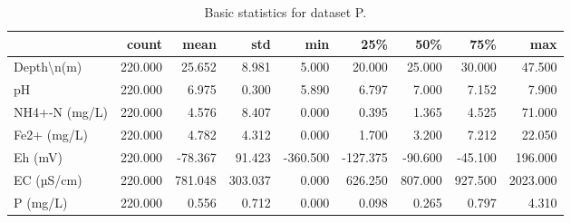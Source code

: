 \begin{table}
\centering
\caption{Basic statistics for dataset P.}
\begin{tabular}{lrrrrrrrr}
\toprule
{} &   count &    mean &     std &      min &      25\% &     50\% &     75\% &      max \\
\midrule
Depth\textbackslash n(m)    & 220.000 &  25.652 &   8.981 &    5.000 &   20.000 &  25.000 &  30.000 &   47.500 \\
pH            & 220.000 &   6.975 &   0.300 &    5.890 &    6.797 &   7.000 &   7.152 &    7.900 \\
NH4+-N (mg/L) & 220.000 &   4.576 &   8.407 &    0.000 &    0.395 &   1.365 &   4.525 &   71.000 \\
Fe2+ (mg/L)   & 220.000 &   4.782 &   4.312 &    0.000 &    1.700 &   3.200 &   7.212 &   22.050 \\
Eh (mV)       & 220.000 & -78.367 &  91.423 & -360.500 & -127.375 & -90.600 & -45.100 &  196.000 \\
EC (µS/cm)    & 220.000 & 781.048 & 303.037 &    0.000 &  626.250 & 807.000 & 927.500 & 2023.000 \\
P (mg/L)      & 220.000 &   0.556 &   0.712 &    0.000 &    0.098 &   0.265 &   0.797 &    4.310 \\
\bottomrule
\end{tabular}
\end{table}
